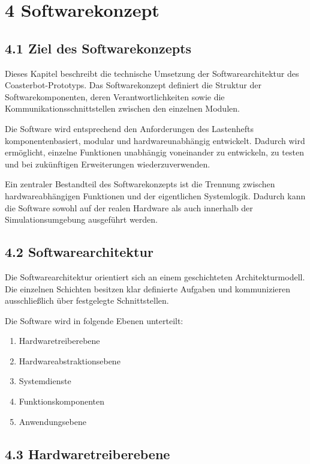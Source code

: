 \documentclass[
]{article}
\providecommand{\tightlist}{%
  \setlength{\itemsep}{0pt}\setlength{\parskip}{0pt}}
\begin{document}
\section{4 Softwarekonzept}\label{softwarekonzept}

\subsection{4.1 Ziel des
Softwarekonzepts}\label{ziel-des-softwarekonzepts}

Dieses Kapitel beschreibt die technische Umsetzung der
Softwarearchitektur des Coasterbot-Prototyps. Das Softwarekonzept
definiert die Struktur der Softwarekomponenten, deren
Verantwortlichkeiten sowie die Kommunikationsschnittstellen zwischen den
einzelnen Modulen.

Die Software wird entsprechend den Anforderungen des Lastenhefts
komponentenbasiert, modular und hardwareunabhängig entwickelt. Dadurch
wird ermöglicht, einzelne Funktionen unabhängig voneinander zu
entwickeln, zu testen und bei zukünftigen Erweiterungen
wiederzuverwenden.

Ein zentraler Bestandteil des Softwarekonzepts ist die Trennung zwischen
hardwareabhängigen Funktionen und der eigentlichen Systemlogik. Dadurch
kann die Software sowohl auf der realen Hardware als auch innerhalb der
Simulationsumgebung ausgeführt werden.

\subsection{4.2 Softwarearchitektur}\label{softwarearchitektur}

Die Softwarearchitektur orientiert sich an einem geschichteten
Architekturmodell. Die einzelnen Schichten besitzen klar definierte
Aufgaben und kommunizieren ausschließlich über festgelegte
Schnittstellen.

Die Software wird in folgende Ebenen unterteilt:

\begin{enumerate}
\def\labelenumi{\arabic{enumi}.}
\tightlist
\item
  Hardwaretreiberebene
\item
  Hardwareabstraktionsebene
\item
  Systemdienste
\item
  Funktionskomponenten
\item
  Anwendungsebene
\end{enumerate}

\subsection{4.3 Hardwaretreiberebene}\label{hardwaretreiberebene}
\end{document}
